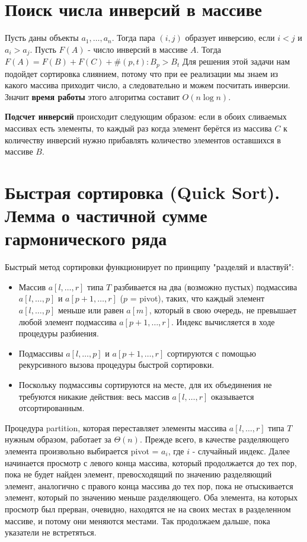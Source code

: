 \section{Поиск числа инверсий в массиве}
\noindent Пусть даны объекты $a_1, \ldots, a_n$. Тогда пара $(i,j)$ образует инверсию, если $i<j$ и $a_i>a_j$.
\newline Пусть $F(A)$ - число инверсий в массиве $A$. Тогда $F(A)=F(B)+F(C)+\#(p,t) : B_p>B_t$
\newline Для решения этой задачи нам подойдет сортировка слиянием, потому что при ее реализации мы знаем из какого массива приходит число, а следовательно и можем посчитать инверсии. Значит \textbf{время работы} этого алгоритма составит $O(n\log{n})$.
\\ \par \textbf{Подсчет инверсий} происходит следующим образом: если в обоих сливаемых массивах есть элементы, то каждый раз когда элемент берётся из массива $C$ к количеству инверсий нужно прибавлять количество элементов оставшихся в массиве $B$.

\setcounter{section}{14}
\section{Быстрая сортировка (Quick Sort). Лемма о частичной сумме гармонического ряда}

\noindent Быстрый метод сортировки функционирует по принципу "разделяй и властвуй":
\begin{itemize}
    \item Массив $a[l, \ldots, r]$ типа $T$ разбивается на два (возможно пустых) подмассива $a[l, \ldots, p]$ и $a[p+1, \ldots, r]$ ($p$ = pivot), таких, что каждый элемент $a[l, \ldots, p]$ меньше или равен $a[m]$, который в свою очередь, не превышает любой элемент подмассива $a[p+1, \ldots, r]$. Индекс вычисляется в ходе процедуры разбиения.
    \item Подмассивы $a[l, \ldots, p]$ и $a[p+1, \ldots, r]$ сортируются с помощью рекурсивного вызова процедуры быстрой сортировки.
    \item Поскольку подмассивы сортируются на месте, для их объединения не требуются никакие действия: весь массив $a[l, \ldots, r]$ оказывается отсортированным.
\end{itemize}
Процедура partition, которая переставляет элементы массива $a[l, \ldots, r]$ типа $T$ нужным образом, работает за $\Theta(n)$. Прежде всего, в качестве разделяющего элемента произвольно выбирается pivot = $a_i$, где $i$ - случайный индекс. Далее начинается просмотр с левого конца массива, который продолжается до тех пор, пока не будет найден элемент, превосходящий по значению разделяющий элемент, аналогично с правого конца массива до тех пор, пока не отыскивается элемент, который по значению меньше разделяющего. Оба элемента, на которых просмотр был прерван, очевидно, находятся не на своих местах в разделенном массиве, и потому они меняются местами. Так продолжаем дальше, пока указатели не встретяться.

